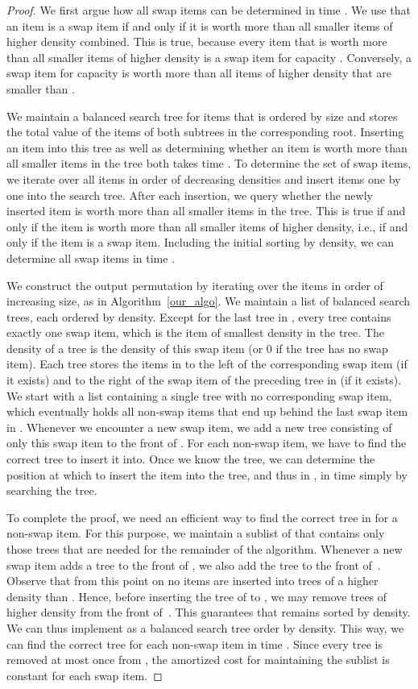 \documentclass[11pt]{article}
\begin{document}
\begin{proof}
We first argue how all swap items can be determined in time .
We use that an item is a swap item if and only if it is worth more
than all smaller items of higher density combined. This is true, because
every item  that is worth more than all smaller items of higher
density is a swap item for capacity . Conversely, a swap item
 for capacity  is worth more than all items of higher
density that are smaller than .

We maintain a balanced search tree for items that is ordered by size
and stores the total value of the items of both subtrees in the corresponding
root. Inserting an item into this tree as well as determining whether
an item is worth more than all smaller items in the tree both takes
time . To determine the set of swap items, we iterate
over all items in order of decreasing densities and insert items one
by one into the search tree. After each insertion, we query whether
the newly inserted item is worth more than all smaller items in the
tree. This is true if and only if the item is worth more than all
smaller items of higher density, i.e., if and only if the item is
a swap item. Including the initial sorting by density, we can determine
all swap items in time .

We construct the output permutation  by iterating over the items
in order of increasing size, as in Algorithm~\ref{our_algo}. We
maintain a list  of balanced search trees, each ordered by density.
Except for the last tree in , every tree contains exactly one
swap item, which is the item of smallest density in the tree. The
density of a tree is the density of this swap item (or 0 if the tree
has no swap item). Each tree stores the items in  to the left
of the corresponding swap item (if it exists) and to the right of
the swap item of the preceding tree in  (if it exists). We start
with a list containing a single tree with no corresponding swap item,
which eventually holds all non-swap items that end up behind the last
swap item in . Whenever we encounter a new swap item, we add
a new tree consisting of only this swap item to the front of .
For each non-swap item, we have to find the correct tree to insert
it into. Once we know the tree, we can determine the position at which
to insert the item into the tree, and thus in , in time 
simply by searching the tree. 

To complete the proof, we need an efficient way to find the correct
tree in  for a non-swap item. For this purpose, we maintain a
sublist  of  that contains only those trees that are needed
for the remainder of the algorithm. Whenever a new swap item 
adds a tree to the front of , we also add the tree to the front
of~. Observe that from this point on no items are inserted into
trees of a higher density than . Hence, before inserting the tree
of  to , we may remove trees of higher density from the front
of~. This guarantees that  remains sorted by density. We
can thus implement  as a balanced search tree order by density.
This way, we can find the correct tree for each non-swap item in time
. Since every tree is removed at most once from ,
the amortized cost for maintaining the sublist is constant for each
swap item.


\end{proof}
\end{document}
